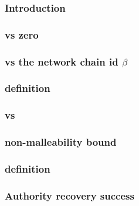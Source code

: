 \subsubsection{Introduction}                                        \label{rlp auth: comparisons: validity: intro}                                 
\subsubsection{\locChainId{} vs zero}                               \label{rlp auth: comparisons: validity: chain id iszero}                       
\subsubsection{\locChainId{} vs the network chain id $\beta$}       \label{rlp auth: comparisons: validity: chain id vs network chain id}          
\subsubsection{\locChainIdIsZeroOrBeta{} definition}                \label{rlp auth: comparisons: validity: defining chain id is 0 or beta}        
\subsubsection{\locNonce{} vs \maxNonce{}}                          \label{rlp auth: comparisons: validity: nonce EIP 2681 bound}                  
\subsubsection{\locSignatureS{} non-malleability bound}             \label{rlp auth: comparisons: validity: signature s non malleability}          
\subsubsection{\locCallEcrecoverExpression{} definition}            \label{rlp auth: comparisons: validity: defining call ecrecover expression}    
\subsubsection{Authority recovery success}                          \label{rlp auth: comparisons: validity: authority recovery success}            
